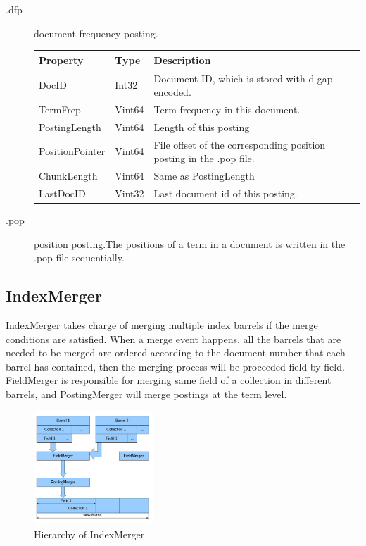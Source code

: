 \begin{description}
\item[.dfp] document-frequency posting.

{\scriptsize
\selectfont
\begin{tabular}{ p{}|p{}|p{}}
\textbf{Property} & \textbf{Type} & \textbf{Description}\\
\hline
DocID               & Int32 & Document ID, which is stored with d-gap encoded.\\
TermFrep            & Vint64 & Term frequency in this document.\\
PostingLength   & Vint64 & Length of this posting\\
PositionPointer  & Vint64 & File offset of the corresponding position posting in the .pop file.\\ 
ChunkLength     & Vint64 & Same as PostingLength\\
LastDocID           & Vint32 & Last document id of this posting.\\
\end{tabular}
}

\item[.pop] position posting.The positions of a term in a document is written in the .pop file sequentially.

\end{description}
\par



\subsection{IndexMerger}

IndexMerger takes charge of merging multiple index barrels if the merge conditions are satisfied. When a merge event happens, all the barrels that are needed to be merged are ordered according to the document number that each barrel has contained, then the merging process will be proceeded field by field. FieldMerger is responsible for merging same field of a collection in different barrels, and PostingMerger will merge postings at the term level.

\begin{figure}[htb]
\centerline{\includegraphics[width=0.4\textwidth]{Figures/indexmanager.jpg}}
\caption{Hierarchy of IndexMerger}\label{indexmanager}
\end{figure}


